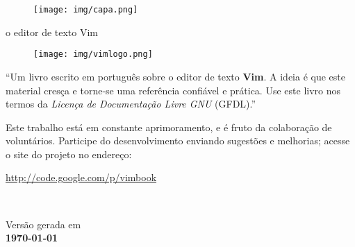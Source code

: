 \documentclass[10pt,a4paper,openany]{book}
\begin{document}

\thispagestyle{empty}
\begin{figure}[htp]
    \centering
    \texttt{[image: img/capa.png]}	
\end{figure}
\clearpage

\thispagestyle{empty}
\begin{center}

{\Huge \sc o editor de texto Vim}

  \vspace{2cm}
  \begin{figure}[h]
    \center
    \texttt{[image: img/vimlogo.png]}
    \label{logodovim}
\end{figure}

   \vspace{5cm}
   \begin{flushright}
   \begin{minipage}[t]{8cm}
          ``Um livro escrito em português sobre o editor de texto {\bf Vim}. A ideia é que este
          material cresça e torne-se uma referência confiável
          e prática. Use este livro nos termos da {\em Licença de Documentação Livre GNU} (GFDL).'' \\
          \par Este trabalho está em constante aprimoramento, e é fruto da
          colaboração de voluntários. Participe do desenvolvimento enviando sugestões e
          melhorias; acesse o site do projeto no endereço: \\
\begin{center}
          \url{http://code.google.com/p/vimbook}
\end{center}
        
   \end{minipage} \\
   \end{flushright}

   \vspace{3cm}

   {\small Versão gerada em \\ \bf \today} %
\end{center}
\end{document}
